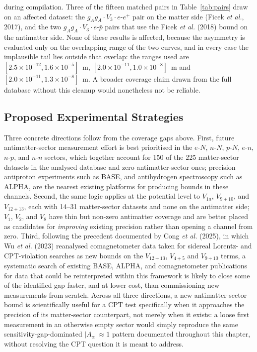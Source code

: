 during compilation. Three of the fifteen matched pairs in
Table~\ref{tab:pairs} draw on an affected dataset: the $g_Ag_A\cdot
V_3\cdot e$-$e^+$ pair on the matter side (Ficek \textit{et al.}, 2017),
and the two $g_Ag_A\cdot V_3\cdot e$-$\bar p$ pairs that use the Ficek
\textit{et al.} (2018) bound on the antimatter side. None of these results
is affected, because the asymmetry is evaluated only on the overlapping
range of the two curves, and in every case the implausible tail lies
outside that overlap: the ranges used are
$[2.5\times10^{-12},1.6\times10^{-5}]$~m,
$[2.0\times10^{-11},1.0\times10^{-8}]$~m and
$[2.0\times10^{-11},1.3\times10^{-8}]$~m. A broader coverage
claim drawn from the full database without this cleanup would nonetheless
not be reliable.

\subsection{Proposed Experimental Strategies}

Three concrete directions follow from the coverage gaps above. First,
future antimatter-sector measurement effort is best prioritised in the
$e$-$N$, $n$-$N$, $p$-$N$, $e$-$n$, $n$-$p$, and $n$-$n$ sectors, which
together account for 150 of the 225 matter-sector datasets in the analysed
database and zero antimatter-sector ones; precision antiproton experiments such as BASE, and
antihydrogen spectroscopy such as ALPHA, are the nearest existing
platforms for producing bounds in these channels. Second, the same
logic applies at the potential level to $V_{1a}$, $V_{9+10}$, and
$V_{12+13}$, each with 14--31 matter-sector datasets and none on the
antimatter side; $V_1$, $V_2$, and $V_8$ have thin but non-zero antimatter
coverage and are better placed as candidates for \emph{improving} existing
precision rather than opening a channel from zero. Third, following the
precedent documented by Cong \textit{et al.} (2025), in which Wu
\textit{et al.} (2023) reanalysed comagnetometer data taken for sidereal
Lorentz- and CPT-violation searches as new bounds on the $V_{12+13}$,
$V_{4+5}$ and $V_{9+10}$ terms, a systematic search of
existing BASE, ALPHA, and comagnetometer publications for data that could
be reinterpreted within this framework is likely to close some of the
identified gap faster, and at lower cost, than commissioning new
measurements from scratch. Across all three directions, a new
antimatter-sector bound is scientifically useful for a CPT test
specifically when it approaches the precision of its matter-sector
counterpart, not merely when it exists: a loose first measurement in an
otherwise empty sector would simply reproduce the same
sensitivity-gap-dominated $|A_\alpha|\approx1$ pattern documented
throughout this chapter, without resolving the CPT question it is meant to
address.
